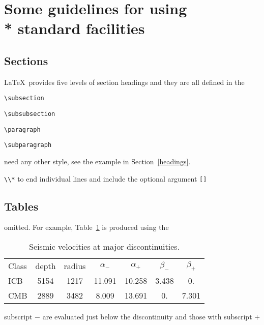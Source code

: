 \section[]{Some guidelines for using\\* standard facilities}

\subsection{Sections}

\LaTeX\ provides five levels of section headings and they are all defined in the
\begin{description}
  \item \verb"\subsection"
  \item \verb"\subsubsection"
  \item \verb"\paragraph"
  \item \verb"\subparagraph"
\end{description}

need any other style, see the example in Section~\ref{headings}.

\verb"\\*" to end individual lines and include the optional argument \verb"[]"

\subsection{Tables}

omitted. For example, Table~\ref{symbols} is produced using the
\begin{table}
 \caption{Seismic velocities at major discontinuities.}\label{symbols}
 \begin{tabular}{@{}lcccccc}
  Class & depth & radius
        & $\alpha _{-}$ & $\alpha _{+}$
        & $\beta _{-}$ & $\beta _{+}$ \\
  ICB & 5154 & 1217 & 11.091 & 10.258
        & 3.438 &  0. \\
  CMB & 2889 & 3482 & 8.009 & 13.691
        & 0. & 7.301 \\
 \end{tabular}

 \medskip
subscript $-$ are evaluated just below the discontinuity and those with subscript $+$
\end{table}



